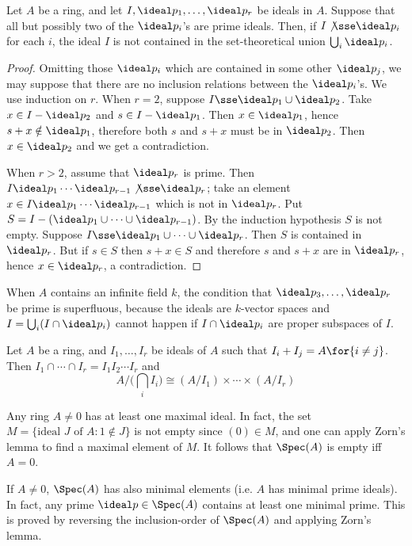\documentclass[../main]{subfiles}
\begin{document}
\newparagraph
Let $A$ be a ring, and let $I,\ideal p_1,\ldots,\ideal p_r$ be ideals in $A$. Suppose that all but possibly two of the $\ideal p_i$'s are prime ideals. Then, if $I\not\sse\ideal p_i$ for each $i$, the ideal $I$ is not contained in the set-theoretical union $\bigcup_i\ideal p_i$.

\begin{proof}
Omitting those $\ideal p_i$ which are contained in some other $\ideal p_j$, we may suppose that there are no inclusion relations between the $\ideal p_i$'s. We use induction on $r$. When $r=2$, suppose $I\sse\ideal p_1\cup\ideal p_2$. Take $x\in I-\ideal p_2$ and $s\in I-\ideal p_1$. Then $x\in\ideal p_1$, hence $s+x\notin\ideal p_1$, therefore both $s$ and $s+x$ must be in $\ideal p_2$. Then $x\in\ideal p_2$ and we get a contradiction.

When $r>2$, assume that $\ideal p_r$ is prime. Then $I\ideal p_1\cdots\ideal p_{r-1}\not\sse\ideal p_r$; take an element $x\in I\ideal p_1\cdots\ideal p_{r-1}$ which is not in $\ideal p_r$. Put $S=I-(\ideal p_1\cup\cdots\cup\ideal p_{r-1})$. By the induction hypothesis $S$ is not empty. Suppose $I\sse\ideal p_1\cup\cdots\cup\ideal p_r$. Then $S$ is contained in $\ideal p_r$. But if $s\in S$ then $s+x\in S$ and therefore $s$ and $s+x$ are in $\ideal p_r$, hence $x\in\ideal p_r$, a contradiction.
\end{proof}

\begin{remark}\label{rem:01.01}
When $A$ contains an infinite field $k$, the condition that $\ideal p_3,\ldots,\ideal p_r$ be prime is superfluous, because the ideals are $k$-vector spaces and $I=\bigcup_i(I\cap\ideal p_i)$ cannot happen if $I\cap\ideal p_i$ are proper subspaces of $I$.
\end{remark}

\newparagraph
Let $A$ be a ring, and $I_1,\ldots,I_r$ be ideals of $A$ such that $I_i+I_j=A\for{i\ne j}$. Then
$I_1\cap\cdots\cap I_r = I_1I_2\cdots I_r$ and
\[A/\bigg(\bigcap_iI_i\bigg) \cong (A/I_1)\times\cdots\times(A/I_r)\]

\newparagraph
Any ring $A\ne0$ has at least one maximal ideal. In fact, the set \newline $M=\{\text{ideal }J\text{ of } A: 1\notin J\}$ is not empty since $(0)\in M$, and one can apply Zorn's lemma to find a maximal element of $M$. It follows that $\Spec(A)$ is empty iff $A=0$.

If $A\ne0$, $\Spec(A)$ has also minimal elements (i.e. $A$ has minimal prime ideals). In fact, any prime $\ideal p\in\Spec(A)$ contains at least one minimal prime. This is proved by reversing the inclusion-order of $\Spec(A)$ and applying Zorn's lemma.
\end{document}
